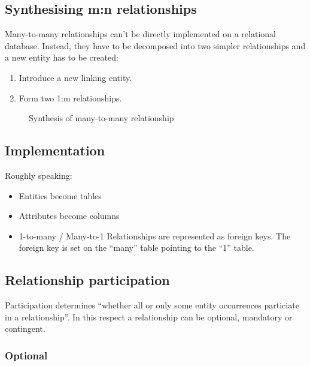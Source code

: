 \subsection{Synthesising m:n
relationships}\label{synthesising-mn-relationships}

Many-to-many relationships can't be directly implemented on a relational
database. Instead, they have to be decomposed into two simpler
relationships and a new entity has to be created:

\begin{enumerate}
\def\labelenumi{\arabic{enumi}.}
\item
  Introduce a new linking entity.
\item
  Form two 1:m relationships.
\end{enumerate}

\begin{figure}[htbp]
\centering
\caption{Synthesis of many-to-many relationship{}}
\end{figure}

\subsection{Implementation}\label{implementation}

Roughly speaking:

\begin{itemize}
\item
  Entities become tables
\item
  Attributes become columns
\item
  1-to-many / Many-to-1 Relationships are represented as foreign keys.
  The foreign key is set on the ``many'' table pointing to the ``1''
  table.
\end{itemize}

\subsection{Relationship
participation}\label{relationship-participation}

Participation determines ``whether all or only some entity occurrences
particiate in a relationship''. In this respect a relationship can be
optional, mandatory or contingent.

\subsubsection{Optional}\label{optional}


